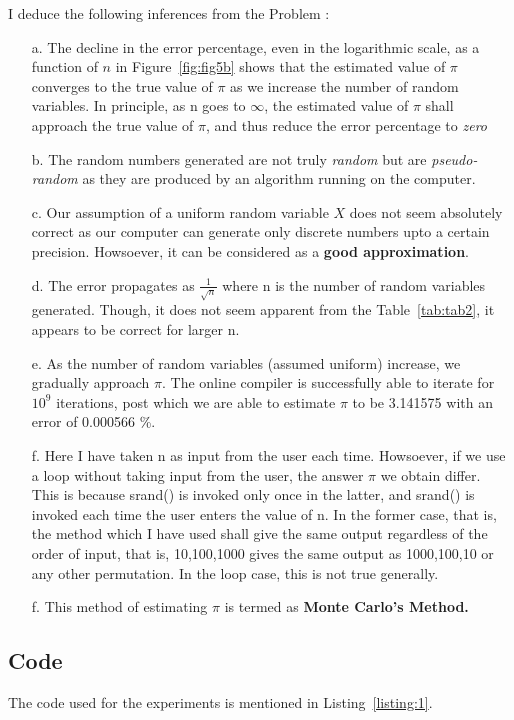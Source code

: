 \documentclass[titlepage, 11pt]{article}
\begin{document}
I deduce the following inferences from the Problem : 
\begin{itemize}
    \item [a.] The decline in the error percentage, even in the logarithmic scale, as a function of $n$ in Figure~\ref{fig:fig5b} shows that the estimated value of $\pi$ converges to the true value of $\pi$ as we increase the number of random variables. In principle, as n goes to $\infty$, the estimated value of $\pi$ shall approach the true value of $\pi$, and thus reduce the error percentage to \textit{zero}
    \item [b.] The random numbers generated are not truly \emph{random} but are \emph{pseudo-random} as they are produced by an algorithm running on the computer. 
    \item [c.] Our assumption of a uniform random variable $X$ does not seem absolutely correct as our computer can generate only discrete numbers upto a certain precision. Howsoever, it can be considered as a \textbf{good approximation}.
    \item [d.]The error propagates as $\frac{1}{\sqrt{n}}$ where n is the number of random variables generated. Though, it does not seem apparent from the Table~\ref{tab:tab2}, it appears to be correct for larger n.
    \item [e.] As the number of random variables (assumed uniform) increase, we gradually approach $\pi$. The online compiler is successfully able to iterate for $10^9$ iterations, post which we are able to estimate $\pi$ to be 3.141575 with an error of 0.000566 \%.
    \item [f.] Here I have taken n as input from the user each time. Howsoever, if we use a loop without taking input from the user, the answer $\pi$ we obtain differ. This is because srand() is invoked only once in the latter, and srand() is invoked each time the user enters the value of n. In the former case, that is, the method which I have used shall give the same output regardless of the order of input, that is, 10,100,1000 gives the same output as 1000,100,10 or any other permutation. In the loop case, this is not true generally. 
    \item [f.] This method of estimating $\pi$ is termed as \textbf{Monte Carlo's Method.}
\end{itemize}


\subsection{Code}
The code used for the experiments is mentioned in Listing~\ref{listing:1}. 
\end{document}
